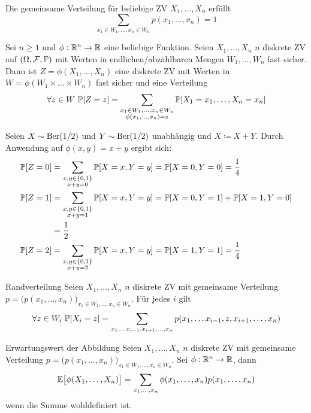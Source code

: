 \begin{prop}
	Die gemeinsame Verteilung für beliebige ZV $X_1, \ldots , X_n$ erfüllt 
	\begin{equation*}
		\sum_{x_1 \in W_1 , \ldots , x_n \in W_n} p (x_1 , \ldots , x_n) = 1
	\end{equation*}
\end{prop}
\begin{prop}
	Sei $n \geq 1$ und $\phi : \mathbb{R}^n \rightarrow \mathbb{R}$ eine beliebige Funktion. Seien $X_1 , \ldots , X_n$ $n$ diskrete ZV
	auf $(\Omega, \mathcal{F} , \mathbb{P})$ mit Werten in endlichen/abzählbaren Mengen $W_1 , \ldots , W_n$ fast sicher. Dann ist $Z =
	\phi (X_1 , \ldots , X_n)$ eine diskrete ZV mit Werten in $W = \phi (W_1 \times \ldots \times W_n)$ fast sicher und
	eine Verteilung 
	\begin{equation*}
		\forall z \in W ~ \mathbb{P} [Z = z] = \sum_{\substack{x_1 \in W_1, \ldots , x_n \in W_n \\ \phi(x_1 , \ldots , x_n) =
		z}} \mathbb{P} [X_1 = x_1 , \ldots , X_n = x_n]
	\end{equation*}
\end{prop}
Seien $X \sim \text{Ber} (1/2)$ und $Y \sim \text{Ber} (1/2)$ unabhängig und $X \coloneqq X + Y$. Durch Anwendung auf $\phi (x,y)
= x+y$ ergibt sich:
\begin{align*}
	\mathbb{P} [Z = 0] &= \sum_{\substack{x,y \in \{0,1\}\\ x + y = 0}} \mathbb{P} [X = x, Y = y] = \mathbb{P} [X = 0, Y = 0] = \frac{1}{4} \\
	\mathbb{P} [Z = 1] &= \sum_{\substack{x,y \in \{0,1\}\\ x + y = 1}} \mathbb{P} [X = x, Y = y] = \mathbb{P} [X = 0, Y = 1] + \mathbb{P} [X = 1, Y
	= 0] \\
					&= \frac{1}{2} \\
	\mathbb{P} [Z = 2] &= \sum_{\substack{x,y \in \{0,1\}\\ x + y = 2}} \mathbb{P} [X = x, Y = y] = \mathbb{P} [X = 1, Y = 1] = \frac{1}{4}
\end{align*}
\begin{tprop}{Randverteilung}
	Seien $X_1 , \ldots , X_n$ $n$ diskrete ZV mit gemeinsame Verteilung $p = \big( p(x_1 , \ldots , x_n)\big)_{x_1 \in W_1 ,
	\ldots , x_n \in W_n}$. Für jedes $i$ gilt
	\begin{equation*}
		\forall z \in W_i ~\mathbb{P} [X_i = z] = \sum_{x_1 , \ldots x_{i-1} , x_{i +1} , \ldots , x_n} p(x_1 , \ldots x_{i-1} ,
		z, x_{i +1} , \ldots , x_n)
	\end{equation*}
\end{tprop}
\begin{tprop}{Erwartungswert der Abbildung}
	Seien $X_1 , \ldots , X_n$ $n$ diskrete ZV mit gemeinsame Verteilung $p = \big( p(x_1 , \ldots , x_n)\big)_{x_1 \in W_1 ,
	\ldots , x_n \in W_n}$. Sei $\phi : \mathbb{R}^n \rightarrow \mathbb{R}$, dann
	\begin{equation*}
		\mathbb{E} \big[\phi (X_1 , \ldots , X_n)\big] = \sum_{x_1 , \ldots , x_n} \phi (x_1 , \ldots , x_n) p(x_1 , \ldots , x_n)
	\end{equation*}
	wenn die Summe wohldefiniert ist.
\end{tprop}
